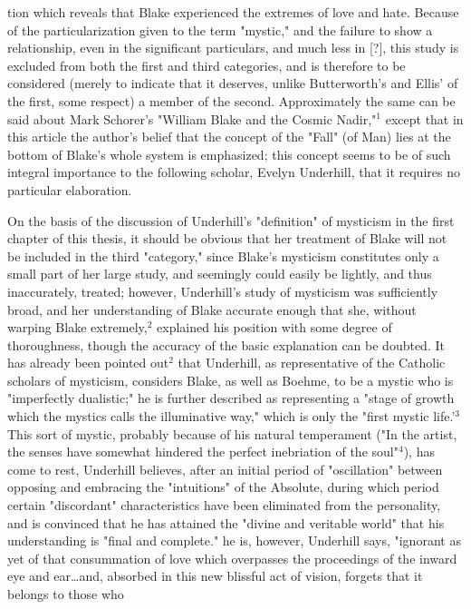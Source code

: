 \noindent tion which reveals that Blake experienced the extremes of love and hate. Because of the particularization given to the term "mystic," and the failure to show a relationship,
even in the significant particulars, and much less in [?], this study is excluded from both the first 
and third categories, and is therefore to be considered (merely to indicate that it deserves, unlike Butterworth's and Ellis' of
the first, some respect) a member of the second. Approximately the same can be said about Mark Schorer's "William Blake and
the Cosmic Nadir,"$^{1}$ except that in this article the author's belief that the concept of the "Fall" (of Man) lies
at the bottom of Blake's whole system is emphasized; this concept seems to be of such integral importance to the following
scholar, Evelyn Underhill, that it requires no particular elaboration.\par
\vspace*{0.5\baselineskip}
On the basis of the discussion of Underhill's "definition" of
mysticism in the first chapter of this thesis, it should
be obvious that her treatment of Blake will not be included in the 
third "category," since Blake's mysticism constitutes only a small part of her large study, and
seemingly could easily be lightly, and thus inaccurately, treated; however, Underhill's study of
mysticism was sufficiently broad, and her understanding of Blake accurate enough that she, without
warping Blake extremely,$^{2}$ explained his position with some degree of thoroughness, though
the accuracy of the basic explanation can be doubted. It has already been
pointed out$^{2}$ that Underhill, as representative of the Catholic
scholars of mysticism, considers Blake, as well as Boehme, to be a mystic
who is "imperfectly dualistic;" he is further described as representing a "stage of growth
which the mystics calls the illuminative way," which is only the "first mystic life.'$^{3}$ This sort of 
mystic, probably because of his natural temperament ("In the artist, the senses have somewhat 
hindered the perfect inebriation of the soul"$^{4}$), has come to rest, Underhill believes, after an 
initial period of "oscillation" between opposing and embracing the "intuitions" of the Absolute, during which 
period certain "discordant" characteristics have been eliminated from the personality, and is convinced that he has 
attained the "divine and veritable world" that his understanding is "final and complete." he is, however, Underhill
says, "ignorant as yet of that consummation of love which overpasses the proceedings of the inward eye and 
ear\dots and, absorbed in this new blissful act of vision, forgets that it belongs to those who
